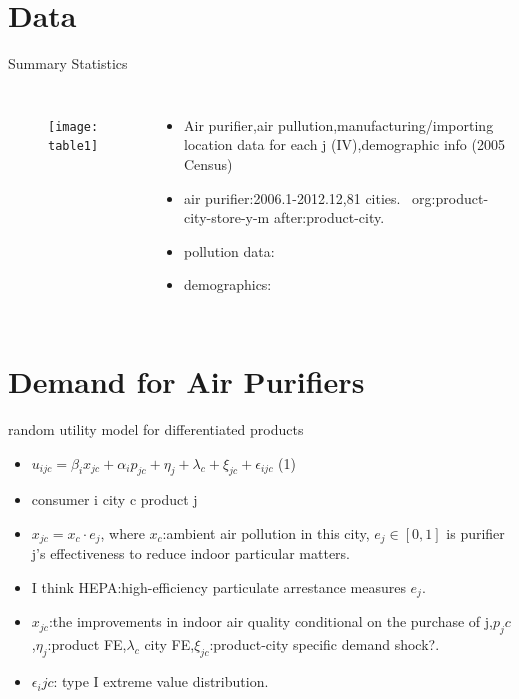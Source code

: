 \documentclass[10pt]{beamer}
\begin{document}
\section{Data}
\begin{frame}{Summary Statistics}
    \begin{columns}[c] 
    \column{9cm}
    \begin{figure}
        \centering
        \texttt{[image: table1]}
    \end{figure}
    \column{4cm}
    \begin{itemize}
        \item Air purifier,air pullution,manufacturing/importing location data for each j (IV),demographic info (2005 Census)
        \item air purifier:2006.1-2012.12,81 cities. \ org:product-city-store-y-m after:product-city.
        \item pollution data:
        \item demographics: 
    \end{itemize}
	\end{columns}
\end{frame}

\section{Demand for Air Purifiers}
\begin{frame}{random utility model for differentiated products}
    \begin{itemize}
        \item $u_{ijc}=\beta_{i}x_{jc}+\alpha_{i}p_{jc}+\eta_j+\lambda_c+\xi_{jc}+\epsilon_{ijc}$ (1)
        \item consumer i city c product j
        \item $x_{jc} = x_c\cdot e_j$, where $x_c$:ambient air pollution in this city, $e_j\in [0,1]$ is purifier j's effectiveness to reduce indoor particular matters. 
        \item I think HEPA:high-efficiency particulate arrestance measures $e_j$. 
        \item $x_{jc}$:the improvements in indoor air quality conditional on the purchase of j,$p_jc$,$\eta_j$:product FE,$\lambda_c$ city FE,$\xi_{jc}$:product-city specific demand shock?.
        \item $\epsilon_ijc$: type I extreme value distribution.
    \end{itemize}
\end{frame}
\end{document}
